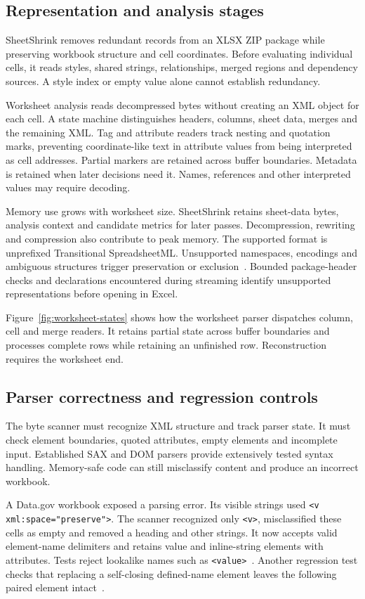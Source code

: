 \subsection{Representation and analysis stages}
SheetShrink removes redundant records from an XLSX ZIP package while preserving
workbook structure and cell coordinates. Before evaluating individual cells, it
reads styles, shared strings, relationships, merged regions and dependency sources.
A style index or empty value alone cannot establish redundancy.

Worksheet analysis reads decompressed bytes without creating an XML object for
each cell. A state machine distinguishes headers, columns, sheet data, merges and
the remaining XML. Tag and attribute readers track nesting and quotation marks,
preventing coordinate-like text in attribute values from being interpreted as cell
addresses. Partial markers are retained across buffer boundaries. Metadata is
retained when later decisions need it. Names, references and other interpreted
values may require decoding.

Memory use grows with worksheet size. SheetShrink retains sheet-data bytes,
analysis context and candidate metrics for later passes. Decompression, rewriting
and compression also contribute to peak memory. The supported format is
unprefixed Transitional SpreadsheetML. Unsupported namespaces, encodings and
ambiguous structures trigger preservation or exclusion~\cite{sheetshrinkcontract}.
Bounded package-header checks and declarations encountered during streaming
identify unsupported representations before opening in Excel.

Figure~\ref{fig:worksheet-states} shows how the worksheet parser dispatches column,
cell and merge readers. It retains partial state across buffer boundaries and
processes complete rows while retaining an unfinished row. Reconstruction requires
the worksheet end.


\subsection{Parser correctness and regression controls}
The byte scanner must recognize XML structure and track parser state. It must
check element boundaries, quoted attributes, empty elements and incomplete input.
Established SAX and DOM parsers provide extensively tested syntax handling.
Memory-safe code can still misclassify content and produce an incorrect workbook.

A Data.gov workbook exposed a parsing error. Its visible strings used
\texttt{<v xml:space="preserve">}. The scanner recognized only \texttt{<v>},
misclassified these cells as empty and removed a heading and other strings. It now
accepts valid element-name delimiters and retains value and inline-string elements
with attributes. Tests reject lookalike names such as
\texttt{<value>}~\cite{attributedvaluefix}. Another regression test checks that
replacing a self-closing defined-name element leaves the following paired element
intact~\cite{definednamefix}.

